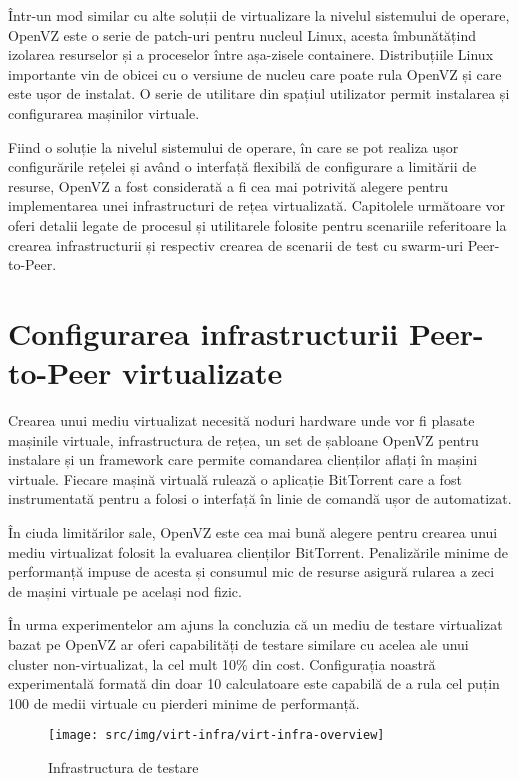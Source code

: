 Într-un mod similar cu alte soluții de virtualizare la nivelul sistemului
de operare, OpenVZ este o serie de patch-uri pentru nucleul Linux,
acesta îmbunătățind izolarea resurselor și a proceselor între așa-zisele
containere. Distribuțiile Linux importante vin de obicei cu o versiune
de nucleu care poate rula OpenVZ și care este ușor de instalat. O
serie de utilitare din spațiul utilizator permit instalarea și configurarea
mașinilor virtuale.

Fiind o soluție la nivelul sistemului de operare, în care se pot realiza
ușor configurările rețelei și având o interfață flexibilă de configurare
a limitării de resurse, OpenVZ a fost considerată a fi cea mai potrivită
alegere pentru implementarea unei infrastructuri de rețea virtualizată.
Capitolele următoare vor oferi detalii legate de procesul și utilitarele
folosite pentru scenariile referitoare la crearea infrastructurii și
respectiv crearea de scenarii de test cu swarm-uri Peer-to-Peer.

\section{Configurarea infrastructurii Peer-to-Peer virtualizate}
\label{sec:virt-infra:setup}

Crearea unui mediu virtualizat necesită noduri hardware unde vor fi
plasate mașinile virtuale, infrastructura de rețea, un set de șabloane
OpenVZ pentru instalare și un framework care permite comandarea clienților
aflați în mașini virtuale. Fiecare mașină virtuală rulează o aplicație
BitTorrent care a fost instrumentată pentru a folosi o interfață în linie
de comandă ușor de automatizat.

În ciuda limitărilor sale, OpenVZ este cea mai bună alegere pentru crearea
unui mediu virtualizat folosit la evaluarea clienților BitTorrent. 
Penalizările minime de performanță impuse de acesta și consumul mic de 
resurse asigură rularea a zeci de mașini virtuale pe același nod fizic.

În urma experimentelor am ajuns la concluzia că un mediu de testare
virtualizat bazat pe OpenVZ ar oferi capabilități de testare similare cu
acelea ale unui cluster non-virtualizat, la cel mult 10\% din cost.
Configurația noastră experimentală formată din doar 10 calculatoare este
capabilă de a rula cel puțin 100 de medii virtuale cu pierderi minime
de performanță.

\begin{figure}
  \begin{center}
    \texttt{[image: src/img/virt-infra/virt-infra-overview]}
  \end{center}
  \caption{Infrastructura de testare}
  \label{fig:virt-infra:infrastructure-overview}
\end{figure}


